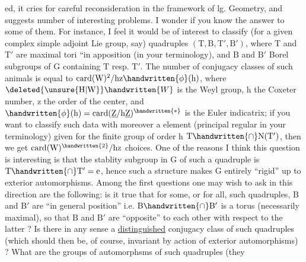 {\begin{tikzpicture}[baseline=(appeared.base),x=1em,y=1em]
\end{tikzpicture}}ed, it cries for careful reconsideration in the framework of lg. Geometry, and suggests number of interesting problems. I wonder if you know the answer to some of them. For instance, I feel it would be of interest to classify (for a given complex simple adjoint Lie group, say) quadruples $(\mathrm{T},\mathrm{B},\mathrm{T}',\mathrm{B}')$, where $\mathrm{T}$ and $\mathrm{T}'$ are maximal tori ``in apposition (in your terminology), and $\mathrm{B}$ and $\mathrm{B}'$ Borel subgroups of $\mathrm{G}$ containing $\mathrm{T}$ resp. $\mathrm{T}'$. The number of conjugacy classes of such animals is equal to $\operatorname{card}(\mathrm{W})^{2}/\mathrm{hz}\handwritten{\phi}(\mathrm{h})$, where $\deleted{\unsure{\mathrm{H}|\mathrm{W}}}\handwritten{W}$ is the Weyl group, $\mathrm{h}$ the Coxeter number, $\mathrm{z}$ the order of the center, and $\handwritten{\phi}(\mathrm{h})=\operatorname{card}(\underline{\mathrm{Z}}/\mathrm{h}\underline{\mathrm{Z}})^{\handwritten{*}}$ is the Euler indicatrix; if you want to classify such data with moreover a  element (principal regular in your terminology) given for the finite group of order $\mathrm{h}$ $\mathrm{T}\handwritten{\cap}\mathrm{N}(\mathrm{T}')$, then we get $\operatorname{card}(\mathrm{W})^{\handwritten{2}}/\mathrm{hz}$ choices. One of the reasons I think this question is interesting is that the stablity subgroup in $\mathrm{G}$ of such a quadruple is $\mathrm{T}\handwritten{\cap}\mathrm{T}'=\mathrm{e}$,\handwritten{\textsuperscript{*}} hence such a structure makes $\mathrm{G}$ entirely ``rigid'' up to exterior automorphisms. Among the first questions one may wish to ask in this direction are the following: is it true that for some, or for all, such quadruples, $\mathrm{B}$ and $\mathrm{B}'$ are ``in general position'' i.e. $\mathrm{B}\handwritten{\cap}\mathrm{B}'$ is a torus (necessarily maximal), so that $\mathrm{B}$ and $\mathrm{B}'$ are ``opposite'' to each other with respect to the latter ? Is there in any sense a \uline{distinguished} conjugacy class of such quadruples (which should then be, of course, invariant by action of exterior automorphisms) ? What are the groups of automorphsms of such quadruples (they

